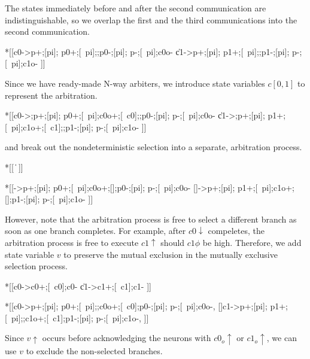 \documentclass{article}
\begin{document}
\noindent
The states immediately before and after the second communication are 
indistinguishable, so we overlap the first and the third communications into 
the second communication.

\begin{hse}
*[[c0\phi->p\phi+;[pi];
    p0+;[~pi];;p0-;[pi];
    p\phi-;[~pi];c0o-
  \|c1\phi->p\phi+;[pi];
    p1+;[~pi];;p1-;[pi];
    p\phi-;[~pi];c1o-
 ]]
\end{hse}

\noindent
Since we have ready-made N-way arbiters, we introduce state variables $c[0,1]$
to represent the arbitration.

\begin{hse}
*[[c0\phi->;p\phi+;[pi];
    p0+;[~pi];c0o+;[~c0\phi];;p0-;[pi];
    p\phi-;[~pi];c0o-
  \|c1\phi->;p\phi+;[pi];
    p1+;[~pi];c1o+;[~c1\phi];;p1-;[pi];
    p\phi-;[~pi];c1o-
 ]]
\end{hse}

\noindent
and break out the nondeterministic selection into a separate, arbitration process.

\begin{hse}
*[[
  \|
 ]]

*[[->p\phi+;[pi];
    p0+;[~pi];c0o+;[];p0-;[pi];
    p\phi-;[~pi];c0o-
  []->p\phi+;[pi];
    p1+;[~pi];c1o+;[];p1-;[pi];
    p\phi-;[~pi];c1o-
 ]]
\end{hse}

\noindent
However, note that the arbitration process is free to select a different branch
as soon as one branch completes. For example, after $c0\!\downarrow$ compeletes,
the arbitration process is free to execute $c1\!\uparrow$ should $c1\phi$ be high.
Therefore, we add state variable $v$ to preserve the mutual exclusion in the
mutually exclusive selection process.

\begin{hse}
*[[c0\phi->c0+;[~c0\phi];c0-
  \|c1\phi->c1+;[~c1\phi];c1-
 ]]

*[[c0->p\phi+;[pi];
    p0+;[~pi];;c0o+;[~c0];p0-;[pi];
    p\phi-;[~pi];c0o-,
  []c1->p\phi+;[pi];
    p1+;[~pi];;c1o+;[~c1];p1-;[pi];
    p\phi-;[~pi];c1o-,
 ]]
\end{hse}

\noindent
Since $v\!\uparrow$ occurs before acknowledging the neurons with $c0_o\!\uparrow$
or $c1_o\!\uparrow$, we can use $v$ to exclude the non-selected branches.
\end{document}
